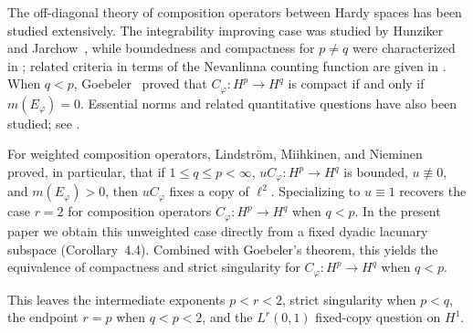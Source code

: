 \documentclass[10pt,a4paper]{amsart}
\begin{document}
 
The off-diagonal theory of composition operators between Hardy spaces
has been studied extensively. The integrability improving case was
studied by Hunziker and Jarchow~\cite{HunzikerJarchow1991}, while
boundedness and compactness for \(p\ne q\) were characterized in
\cite{ContrerasHernandezDiaz2003,BlascoJarchow2005}; related criteria in terms of the Nevanlinna counting function are
given in \cite{PerezGonzalezRattyaVukotic2007}. When \(q<p\),
Goebeler~\cite[Corollary~5, p.~390]{Goebeler2001} proved that
\(C_\varphi:H^p\to H^q\) is compact if and only if
\(m(E_\varphi)=0\). Essential norms and related quantitative questions
have also been studied; see
\cite{GorkinMacCluer2004,Demazeux2011,ShiLi2018,Bayart2024}.

For weighted composition operators, Lindstr\"om, Miihkinen, and
Nieminen~\cite{LindstromMiihkinenNieminen2020} proved, in particular,
that if \(1\le q\le p<\infty\), \(uC_\varphi:H^p\to H^q\) is bounded,
\(u\not\equiv0\), and \(m(E_\varphi)>0\), then \(uC_\varphi\) fixes a
copy of \(\ell^2\). Specializing to $u\equiv1$ recovers the case
$r=2$ for composition operators $C_{\varphi}:H^{p}\to H^{q}$ when $q<p$.
In the present paper we obtain this unweighted case directly from a fixed
dyadic lacunary subspace (Corollary~4.4). Combined with Goebeler's theorem,
this yields the equivalence of compactness and strict singularity for
$C_{\varphi}:H^{p}\to H^{q}$ when $q<p$.
 

This leaves the intermediate exponents \(p<r<2\), strict
singularity when \(p<q\), the endpoint \(r=p\) when \(q<p<2\),
and the \(L^r(0,1)\) fixed-copy question on \(H^1\).
 
\end{document}
